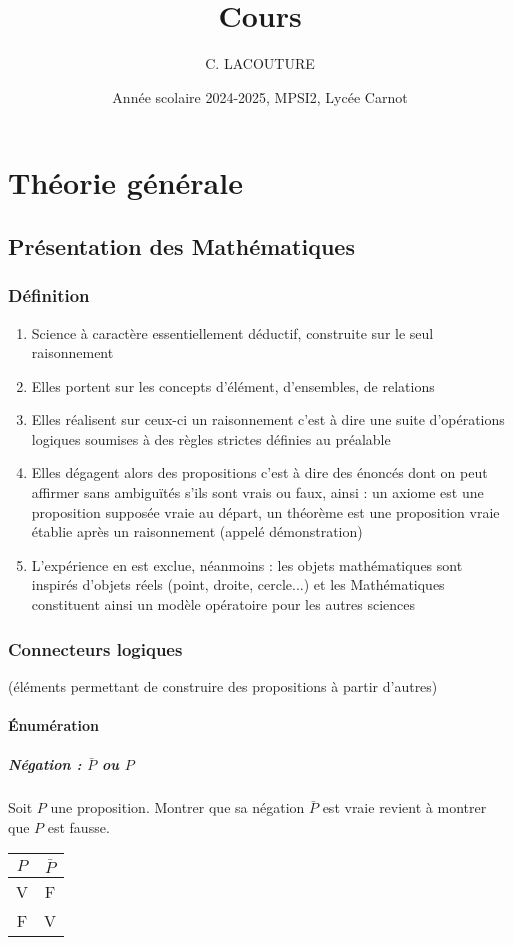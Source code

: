 \documentclass[12pt,a4paper,french]{book}
\title{Cours}
\author{C. LACOUTURE}
\date{Année scolaire 2024-2025, MPSI2, Lycée Carnot}
\begin{document}
	
\maketitle
\tableofcontents
\part{Théorie générale}
\chapter{Présentation des Mathématiques}
\section{Définition}
\begin{enumerate}
	\item Science à caractère essentiellement déductif, construite sur le seul raisonnement
	\item Elles portent sur les concepts d'élément, d'ensembles, de relations
	\item Elles réalisent sur ceux-ci un raisonnement c'est à dire une suite d'opérations logiques soumises à des règles strictes définies au préalable
	\item Elles dégagent alors des propositions c'est à dire des énoncés dont on peut affirmer sans ambiguïtés s'ils sont vrais ou faux, ainsi : un axiome est une proposition supposée vraie au départ, un théorème est une proposition vraie établie après un raisonnement (appelé démonstration)
	\item L'expérience en est exclue, néanmoins : les objets mathématiques sont inspirés d'objets réels (point, droite, cercle...) et les Mathématiques constituent ainsi un modèle opératoire pour les autres sciences
\end{enumerate}

\section{Connecteurs logiques}
 (éléments permettant de construire des propositions à partir d'autres)
\subsection{Énumération}
\subsubsection{Négation : $\bar{P}$ ou \textlnot$P$} 
Soit $P$ une proposition. Montrer que sa négation $\bar{P}$ est vraie revient à montrer que $P$ est fausse.
\begin{center}
	\begin{tabular}{ |c||c| }
		\hline
		$P$ & $\bar{P}$\\
		\hline
		V&F\\
		F&V\\
		\hline
	\end{tabular}
\end{center}
\end{document}
